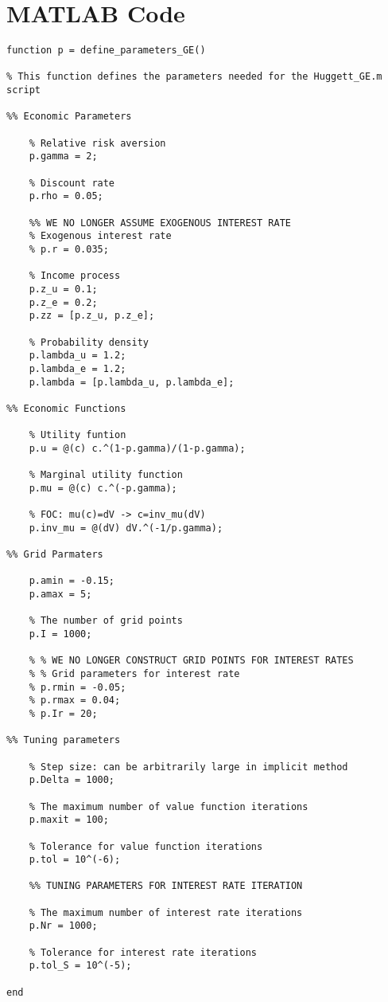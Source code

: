 \section*{MATLAB Code}
\begin{lstlisting}
function p = define_parameters_GE()

% This function defines the parameters needed for the Huggett_GE.m script

%% Economic Parameters
    
    % Relative risk aversion
    p.gamma = 2;

    % Discount rate
    p.rho = 0.05;
    
    %% WE NO LONGER ASSUME EXOGENOUS INTEREST RATE
    % Exogenous interest rate
    % p.r = 0.035;
    
    % Income process
    p.z_u = 0.1;
    p.z_e = 0.2;
    p.zz = [p.z_u, p.z_e];

    % Probability density   
    p.lambda_u = 1.2;
    p.lambda_e = 1.2;
    p.lambda = [p.lambda_u, p.lambda_e];
    
%% Economic Functions
    
    % Utility funtion
    p.u = @(c) c.^(1-p.gamma)/(1-p.gamma);

    % Marginal utility function
    p.mu = @(c) c.^(-p.gamma);

    % FOC: mu(c)=dV -> c=inv_mu(dV)
    p.inv_mu = @(dV) dV.^(-1/p.gamma);

%% Grid Parmaters

    p.amin = -0.15;
    p.amax = 5;

    % The number of grid points
    p.I = 1000;

    % % WE NO LONGER CONSTRUCT GRID POINTS FOR INTEREST RATES
    % % Grid parameters for interest rate
    % p.rmin = -0.05;
    % p.rmax = 0.04;
    % p.Ir = 20;

%% Tuning parameters

    % Step size: can be arbitrarily large in implicit method
    p.Delta = 1000;

    % The maximum number of value function iterations
    p.maxit = 100;

    % Tolerance for value function iterations
    p.tol = 10^(-6);

    %% TUNING PARAMETERS FOR INTEREST RATE ITERATION
    
    % The maximum number of interest rate iterations
    p.Nr = 1000;

    % Tolerance for interest rate iterations
    p.tol_S = 10^(-5);

end

\end{lstlisting}


